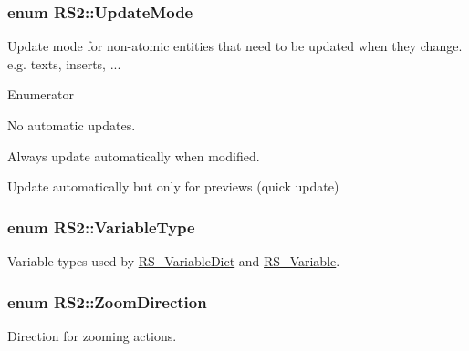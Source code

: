 \hypertarget{classRS2_ab05150052f314f729c76afff34f89bc5}{
\subsubsection[{Update\-Mode}]{\setlength{\rightskip}{0pt plus 5cm}enum {\bf R\-S2\-::\-Update\-Mode}}}\label{classRS2_ab05150052f314f729c76afff34f89bc5}
Update mode for non-\/atomic entities that need to be updated when they change. e.\-g. texts, inserts, ... \begin{Desc}
\item[Enumerator]\par
\begin{description}
\item[{\em 
\hypertarget{classRS2_ab05150052f314f729c76afff34f89bc5a2f5f049e086d7d82c039accb671c7556}{No\-Update}\label{classRS2_ab05150052f314f729c76afff34f89bc5a2f5f049e086d7d82c039accb671c7556}
}]No automatic updates. \item[{\em 
\hypertarget{classRS2_ab05150052f314f729c76afff34f89bc5a83180c94271651d6a709844b1453bf58}{Update}\label{classRS2_ab05150052f314f729c76afff34f89bc5a83180c94271651d6a709844b1453bf58}
}]Always update automatically when modified. \item[{\em 
\hypertarget{classRS2_ab05150052f314f729c76afff34f89bc5a5c8e722c8bfb435b79831633ee96b4d3}{Preview\-Update}\label{classRS2_ab05150052f314f729c76afff34f89bc5a5c8e722c8bfb435b79831633ee96b4d3}
}]Update automatically but only for previews (quick update) \end{description}
\end{Desc}
\hypertarget{classRS2_af1c96c2254f823f3836e8839482870d7}{
\subsubsection[{Variable\-Type}]{\setlength{\rightskip}{0pt plus 5cm}enum {\bf R\-S2\-::\-Variable\-Type}}}\label{classRS2_af1c96c2254f823f3836e8839482870d7}
Variable types used by \hyperlink{classRS__VariableDict}{R\-S\-\_\-\-Variable\-Dict} and \hyperlink{classRS__Variable}{R\-S\-\_\-\-Variable}. \hypertarget{classRS2_a7416f66b1968e3ccb9b70b8f48bac8df}{
\subsubsection[{Zoom\-Direction}]{\setlength{\rightskip}{0pt plus 5cm}enum {\bf R\-S2\-::\-Zoom\-Direction}}}\label{classRS2_a7416f66b1968e3ccb9b70b8f48bac8df}
Direction for zooming actions. 

